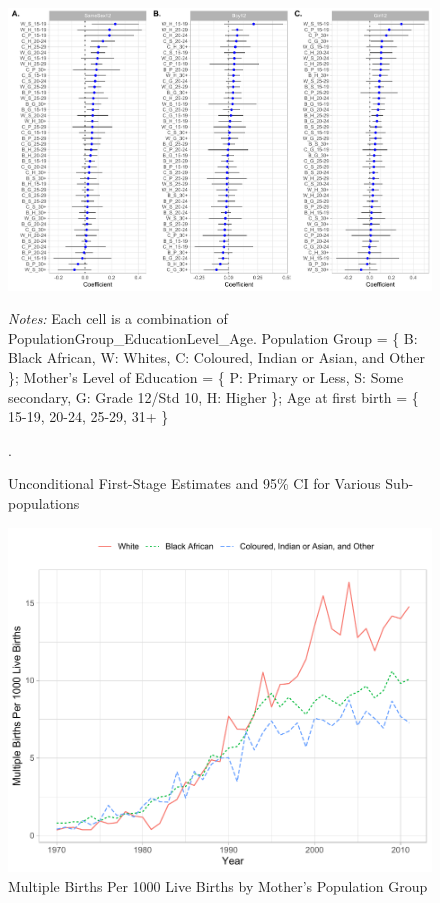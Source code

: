 \documentclass[11pt,a4paper]{article}
\newcommand\fnote[1]{\captionsetup{font=footnotesize}\caption*{#1}}
\begin{document}
\begin{figure}
\centering
\caption{\label{fig:03}Unconditional First-Stage Estimates and 95\% CI for Various Sub-populations}
\includegraphics[width=\textwidth]{figures/monot.pdf}
\fnote{\textit{Notes:} Each cell is a combination of PopulationGroup\_EducationLevel\_Age. Population Group = \{ B: Black African, W: Whites, C: Coloured, Indian or Asian, and Other \}; Mother's Level of Education = \{ P: Primary or Less, S: Some secondary, G: Grade 12/Std 10, H: Higher \}; Age at first birth = \{ 15-19, 20-24, 25-29, 31+ \} }.
\end{figure}

\begin{figure}[h!]
\centering
\caption{\label{fig:04}Multiple Births Per 1000 Live Births by Mother's Population Group}
\includegraphics[width=\textwidth]{figures/line_pp.pdf}
\end{figure}
\end{document}
